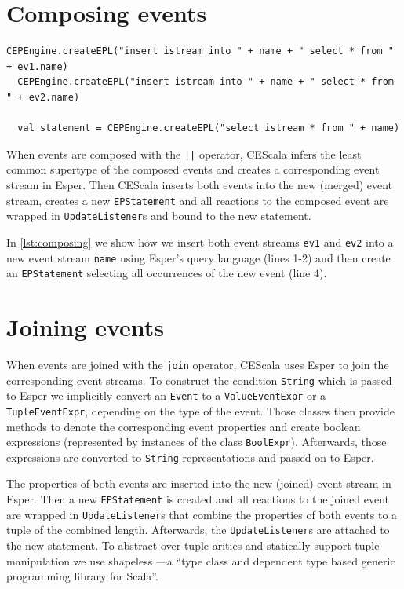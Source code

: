 \documentclass[book,type=bsc,colorback,accentcolor=tud8b,12pt,twoside]{tudthesis}
\begin{document}
\section{Composing events}
\label{sec:composing-events}

\begin{lstlisting}[caption=Composing events,label=lst:composing,float=tp]
  CEPEngine.createEPL("insert istream into " + name + " select * from " + ev1.name)
  CEPEngine.createEPL("insert istream into " + name + " select * from " + ev2.name)

  val statement = CEPEngine.createEPL("select istream * from " + name)
\end{lstlisting}

When events are composed with the \mbox{\texttt{||}} operator, CEScala infers the least common supertype of the composed events and creates a corresponding event stream in Esper.  Then CEScala inserts both events into the new (merged) event stream, creates a new \mbox{\texttt{EPStatement}} and all reactions to the composed event are wrapped in \mbox{\texttt{UpdateListener}}s and bound to the new statement.  

In \autoref{lst:composing} we show how we insert both event streams \mbox{\texttt{ev1}} and \mbox{\texttt{ev2}} into a new event stream \mbox{\texttt{name}} using Esper's query language (lines 1-2) and then create an \mbox{\texttt{EPStatement}} selecting all occurrences of the new event (line 4).  

\section{Joining events}
\label{sec:joining-events}

When events are joined with the \mbox{\texttt{join}} operator, CEScala uses Esper to join the corresponding event streams.  To construct the condition \mbox{\texttt{String}} which is passed to Esper we implicitly convert an \mbox{\texttt{Event}} to a \mbox{\texttt{ValueEventExpr}} or a \mbox{\texttt{TupleEventExpr}}, depending on the type of the event.  Those classes then provide methods to denote the corresponding event properties and create boolean expressions (represented by instances of the class \mbox{\texttt{BoolExpr}}).  Afterwards, those expressions are converted to \mbox{\texttt{String}} representations and passed on to Esper.  

The properties of both events are inserted into the new (joined) event stream in Esper.  Then a new \mbox{\texttt{EPStatement}} is created and all reactions to the joined event are wrapped in \mbox{\texttt{UpdateListener}}s that combine the properties of both events to a tuple of the combined length.  Afterwards, the \mbox{\texttt{UpdateListener}}s are attached to the new statement.  To abstract over tuple arities and statically support tuple manipulation we use shapeless \cite{shapeless}---a ``type class and dependent type based generic programming library for Scala''.  
\end{document}
